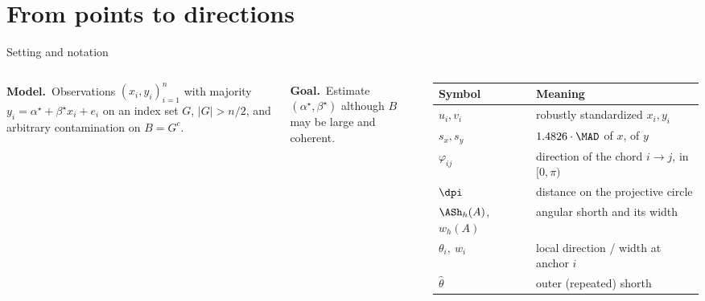 \documentclass[aspectratio=169,9pt]{beamer}
\begin{document}
\section{From points to directions}
\begin{frame}{Setting and notation}
\begin{columns}[T]
\textbf{Model.}\ Observations $(x_i,y_i)_{i=1}^n$ with majority $y_i=\alpha^\star+\beta^\star x_i+e_i$ on an index set $G$, $|G|>n/2$, and arbitrary contamination on $B=G^{c}$.\medskip

\textbf{Goal.}\ Estimate $(\alpha^\star,\beta^\star)$ although $B$ may be large and coherent.\medskip

\footnotesize\renewcommand{\arraystretch}{1.12}
\begin{tabular}{@{}l p{4.9cm}@{}}
\toprule\textbf{Symbol}&\textbf{Meaning}\\\midrule
$u_i,v_i$ & robustly standardized $x_i,y_i$ \\
$s_x,s_y$ & $1.4826\cdot\MAD$ of $x$, of $y$ \\
$\varphi_{ij}$ & direction of the chord $i\!\to\! j$, in $[0,\pi)$\\
$\dpi$ & distance on the projective circle\\
$\ASh_h(A)$, $w_h(A)$ & angular shorth and its width\\
$\theta_i,\ w_i$ & local direction / width at anchor $i$\\
$\hat\theta$ & outer (repeated) shorth\\
\bottomrule\end{tabular}
\end{columns}
\end{frame}
\end{document}
